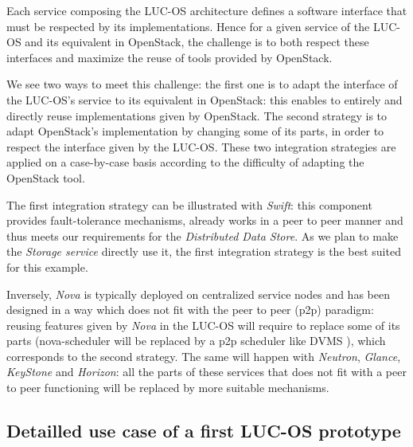 Each service composing the LUC-OS architecture defines a software interface 
that must be respected by its implementations. Hence for a given service of the
LUC-OS and its equivalent in OpenStack, the challenge is to both respect these
interfaces and maximize the reuse of tools provided by OpenStack. 

We see two ways to meet this challenge: the first one is to adapt the interface 
of the LUC-OS's service to its equivalent in OpenStack: this enables to entirely
and directly reuse implementations given by OpenStack. The second strategy is
to adapt OpenStack's implementation by changing some of its parts, in order to 
respect the interface given by the LUC-OS. These two integration strategies are
applied on a case-by-case basis according to the difficulty of adapting the 
OpenStack tool. 

The first integration strategy can be illustrated with \emph{Swift}: this 
component provides fault-tolerance mechanisms, already works in a peer to peer
manner and thus meets our requirements for the \emph{Distributed Data Store}. As
we plan to make the \emph{Storage service} directly use it, the first 
integration strategy is the best suited for this example.

Inversely, \emph{Nova} is typically deployed on centralized service nodes and 
has been designed in a way which does not fit with the peer to peer (p2p) 
paradigm: reusing features given by \emph{Nova} in the LUC-OS will require to 
replace some of its parts (nova-scheduler will be replaced by a p2p scheduler 
like DVMS \cite{quesnel:ispa2013}), which corresponds to the second strategy. 
The same will happen with \emph{Neutron}, \emph{Glance}, \emph{KeyStone} and
\emph{Horizon}: all the parts of these services that does not fit with a peer to
peer functioning will be replaced by more suitable mechanisms.

\subsection{Detailled use case of a first LUC-OS prototype}
\label{sub:sec:revisiting_openstack}


